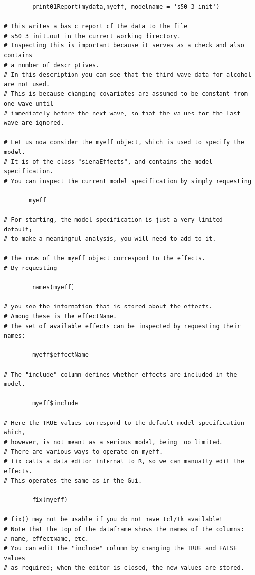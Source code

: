 \documentclass[a4paper,fleqn]{article}
\newcommand{\+}{\, + \,}
\begin{document}
{\begin{verbatim}
        print01Report(mydata,myeff, modelname = 's50_3_init')

# This writes a basic report of the data to the file
# s50_3_init.out in the current working directory.
# Inspecting this is important because it serves as a check and also contains
# a number of descriptives.
# In this description you can see that the third wave data for alcohol are not used.
# This is because changing covariates are assumed to be constant from one wave until
# immediately before the next wave, so that the values for the last wave are ignored.

# Let us now consider the myeff object, which is used to specify the model.
# It is of the class "sienaEffects", and contains the model specification.
# You can inspect the current model specification by simply requesting

       myeff

# For starting, the model specification is just a very limited default;
# to make a meaningful analysis, you will need to add to it.

# The rows of the myeff object correspond to the effects.
# By requesting

        names(myeff)

# you see the information that is stored about the effects.
# Among these is the effectName.
# The set of available effects can be inspected by requesting their names:

        myeff$effectName

# The "include" column defines whether effects are included in the model.

        myeff$include

# Here the TRUE values correspond to the default model specification which,
# however, is not meant as a serious model, being too limited.
# There are various ways to operate on myeff.
# fix calls a data editor internal to R, so we can manually edit the effects.
# This operates the same as in the Gui.

        fix(myeff)

# fix() may not be usable if you do not have tcl/tk available!
# Note that the top of the dataframe shows the names of the columns:
# name, effectName, etc.
# You can edit the "include" column by changing the TRUE and FALSE values
# as required; when the editor is closed, the new values are stored.


\end{verbatim}}
\end{document}
